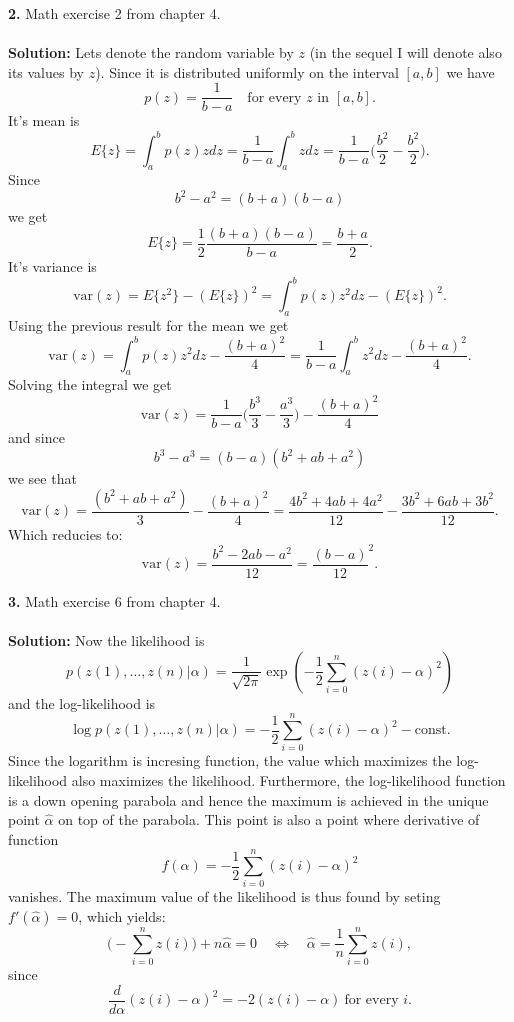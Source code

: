 \documentclass[10pt,a4paper]{amsart}
\newenvironment{tehtratk}%
             {\begin{list}{\arabic{enumi}.}{\usecounter{enumi}%
              \setlength{\labelsep}{0.5em}%
              \settowidth{\labelwidth}{\arabic{enumi}.}%
              \setlength{\leftmargin}{\labelwidth+\labelsep}}}%
             {\end{list}}
\begin{document}
\begin{tehtratk}
\item[\textbf{2.}] Math exercise 2 from chapter 4.\\
\\
\textbf{Solution:} Lets denote the random variable by $z$ (in the sequel I will
denote also its values by $z$). Since it is distributed uniformly on the
interval $[a, b]$ we have
\[
p(z) = \frac{1}{b - a} \quad \text{for every $z$ in $[a, b]$}.
\]
It's mean is
\[
E\{z\} = \int_a^b p(z)zdz = \frac{1}{b - a}\int_a^b zdz =
\frac{1}{b - a}\Big(\frac{b^2}{2} - \frac{b^2}{2}\Big).
\]
Since
\[
b^2 - a^2 = (b + a)(b - a)
\]
we get
\[
E\{z\} =
\frac{1}{2}\frac{(b + a)(b - a)}{b - a} = \frac{b + a}{2}.
\]
It's variance is
\[
\text{var}(z) = E\{z^2\} - (E\{z\})^2 = \int_a^b p(z)z^2dz  - (E\{z\})^2.
\]
Using the previous result for the mean we get
\[
\text{var}(z) = \int_a^b p(z)z^2dz  - \frac{(b + a)^2}{4} =
\frac{1}{b - a}\int_a^b z^2dz - \frac{(b + a)^2}{4}.
\]
Solving the integral we get
\[
\text{var}(z) =
\frac{1}{b - a}\Big(\frac{b^3}{3} - \frac{a^3}{3}\Big)- \frac{(b + a)^2}{4}
\]
and since
\[
b^3 - a^3 = (b -a)(b^2 + ab + a^2)
\]
we see that
\[
\text{var}(z) = \frac{(b^2 + ab + a^2)}{3} - \frac{(b + a)^2}{4}
= \frac{4b^2 + 4ab + 4a^2}{12} -\frac{3b^2 + 6ab + 3b^2}{12}.\]
Which reducies to:
\[
\text{var}(z) = \frac{b^2 - 2ab - a^2}{12} = \frac{(b - a)}{12}^2.
\]
\vspace{0.3cm}
\item[\textbf{3.}] Math exercise 6 from chapter 4.\\
\\
\textbf{Solution:} Now the likelihood is
\[
p(z(1), \ldots , z(n)|\alpha) =
\frac{1}{\sqrt{2 \pi}}\exp(-\frac{1}{2}\sum_{i = 0}^n(z(i) - \alpha)^2)
\]
and the log-likelihood is
\[
\log p(z(1), \ldots , z(n)|\alpha) =
-\frac{1}{2}\sum_{i = 0}^n(z(i) - \alpha)^2 - \text{const.}
\]
Since the logarithm is incresing function, the value which maximizes the
log-likelihood also maximizes the likelihood. Furthermore, the log-likelihood
function is a down opening parabola and hence the maximum is achieved in the
unique point $\hat{\alpha}$ on top of the parabola. This point is also a point
where derivative of function
\[f(\alpha) = -\frac{1}{2}\sum_{i = 0}^n(z(i) - \alpha)^2\]
vanishes.
The maximum value of the likelihood is thus found by seting
$f'(\hat{\alpha}) = 0$, which yields:
\[
\big(-\sum_{i = 0}^n z(i)\big) + n\hat{\alpha} = 0
\quad \Leftrightarrow \quad \hat{\alpha} = \frac{1}{n}\sum_{i = 0}^n z(i),
\]
since
\[
\frac{d}{d\alpha}(z(i) - \alpha)^2 = -2(z(i) -\alpha) \ \text{for every $i$.}
\]
\end{tehtratk}
\end{document}
